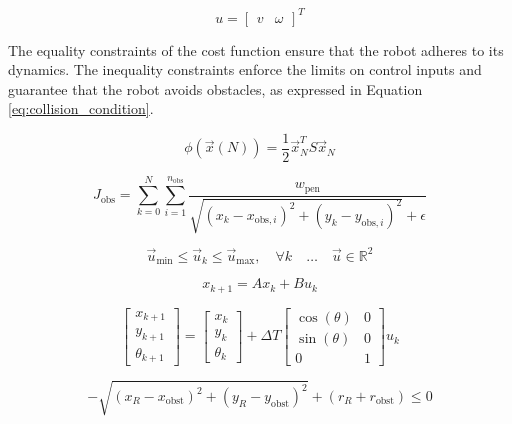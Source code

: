 \documentclass[conference]{IEEEtran}
\begin{document}
\begin{equation}\label{eq:control_vector}
    u = \begin{bmatrix}
    v & \omega
\end{bmatrix}^T
\end{equation}

The equality constraints of the cost function ensure that the robot adheres to its dynamics. The inequality constraints enforce the limits on control inputs and guarantee that the robot avoids obstacles, as expressed in Equation \ref{eq:collision_condition}.

\begin{equation}
\label{eq:phi_definition}
\phi(\vec{x}(N)) = \frac{1}{2} \vec{x}_N^T S \vec{x}_N
\end{equation}

\begin{equation}
J_{\text{obs}} = \sum_{k=0}^{N} \sum_{i=1}^{n_{\text{obs}}} \frac{w_{\text{pen}}}{\sqrt{(x_k - x_{\text{obs},i})^2 + (y_k - y_{\text{obs},i})^2} + \epsilon}
\end{equation}


\begin{equation}
\label{eq:u_constraints}
\vec{u}_{\text{min}} \leq \vec{u}_k \leq \vec{u}_{\text{max}}, \quad \forall k \quad \text{…} \quad \vec{u} \in \mathbb{R}^2
\end{equation}

\begin{equation} \label{eq:1}
    x_{k+1} = Ax_k + Bu_k
\end{equation}


\begin{equation} \label{eq:discrete_state_space_equation_DDMR}
\begin{bmatrix}
    x_{k+1} \\
    y_{k+1} \\
    \theta_{k+1}
\end{bmatrix}
=
\begin{bmatrix}
    x_k \\
    y_k \\
    \theta_k
\end{bmatrix}
+ \Delta T
\begin{bmatrix}
    \cos(\theta) & 0 \\
    \sin(\theta) & 0 \\
    0 & 1
\end{bmatrix}
u_k
\end{equation}


\begin{equation}
\label{eq:collision_condition}
-\sqrt{(x_R - x_{\text{obst}})^2 + (y_R - y_{\text{obst}})^2} + (r_R + r_{\text{obst}}) \leq 0
\end{equation}
\end{document}
